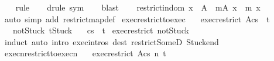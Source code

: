 \begin{isabellebody}
\ \ \isamarkupfalse%
\ rule\isanewline
\ \ \isamarkupfalse%
\ {\isacharparenleft}drule\ sym{\isacharparenright}\isanewline
\ \ \isamarkupfalse%
\ blast\isanewline
\ \ \isamarkupfalse%
%
\endisatagproof
{\isafoldproof}%
%
\isadelimproof
\isanewline
%
\endisadelimproof
\isanewline
{}\isamarkupfalse%
\ restrict{\isacharunderscore}in{\isacharunderscore}dom{\isacharcolon}\ {\isachardoublequoteopen}x\ {\isasymin}\ A\ {\isasymLongrightarrow}\ {\isacharparenleft}m{\isacharbar}\isactrlbsub A\isactrlesub {\isacharparenright}\ x\ {\isacharequal}\ m\ x{\isachardoublequoteclose}\isanewline
%
\isadelimproof
\ \ %
\endisadelimproof
%
\isatagproof
{}\isamarkupfalse%
\ {\isacharparenleft}auto\ simp\ add{\isacharcolon}\ restrict{\isacharunderscore}map{\isacharunderscore}def{\isacharparenright}%
\endisatagproof
{\isafoldproof}%
%
\isadelimproof
\isanewline
%
\endisadelimproof
\isanewline
\isanewline
{}\isamarkupfalse%
\ exec{\isacharunderscore}restrict{\isacharunderscore}to{\isacharunderscore}exec{\isacharcolon}\isanewline
\ \ \ exec{\isacharunderscore}restrict{\isacharcolon}\ {\isachardoublequoteopen}{\isasymGamma}{\isacharbar}\isactrlbsub A\isactrlesub {\isasymturnstile}{\isasymlangle}c{\isacharcomma}s{\isasymrangle}\ {\isasymRightarrow}\ t{\isachardoublequoteclose}\ \isanewline
\ \ \ notStuck{\isacharcolon}\ {\isachardoublequoteopen}t{\isasymnoteq}Stuck{\isachardoublequoteclose}\isanewline
\ \ \ {\isachardoublequoteopen}{\isasymGamma}{\isasymturnstile}{\isasymlangle}c{\isacharcomma}s{\isasymrangle}\ {\isasymRightarrow}\ t{\isachardoublequoteclose}\isanewline
%
\isadelimproof
%
\endisadelimproof
%
\isatagproof
{}\isamarkupfalse%
\ exec{\isacharunderscore}restrict\ notStuck\isanewline
{}\isamarkupfalse%
\ {\isacharparenleft}induct{\isacharparenright}\ {\isacharparenleft}auto\ intro{\isacharcolon}\ exec{\isachardot}intros\ dest{\isacharcolon}\ restrict{\isacharunderscore}SomeD\ Stuck{\isacharunderscore}end{\isacharparenright}%
\endisatagproof
{\isafoldproof}%
%
\isadelimproof
\isanewline
%
\endisadelimproof
\isanewline
{}\isamarkupfalse%
\ execn{\isacharunderscore}restrict{\isacharunderscore}to{\isacharunderscore}execn{\isacharcolon}\isanewline
\ \ \ exec{\isacharunderscore}restrict{\isacharcolon}\ {\isachardoublequoteopen}{\isasymGamma}{\isacharbar}\isactrlbsub A\isactrlesub {\isasymturnstile}{\isasymlangle}c{\isacharcomma}s{\isasymrangle}\ {\isacharequal}n{\isasymRightarrow}\ t{\isachardoublequoteclose}\ \isanewline

\end{isabellebody}
